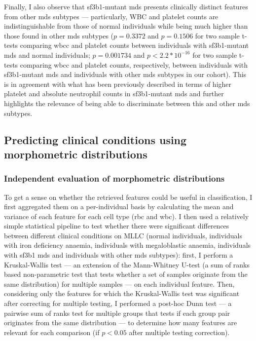 Finally, I also observe that \ac{sf3b1}-mutant \ac{mds} presents clinically distinct features from other \ac{mds} subtypes --- particularly, WBC and platelet counts are indistinguishable from those of normal individuals while being much higher than those found in other \ac{mds} subtypes ($p=0.3372$ and $p=0.1506$ for two sample t-tests comparing \ac{wbcc} and platelet counts between individuals with \ac{sf3b1}-mutant \ac{mds} and normal individuals; $p=0.001734$ and $p<2.2*10^{-16}$ for two sample t-tests comparing \ac{wbcc} and platelet counts, respectively, between individuals with \ac{sf3b1}-mutant \ac{mds} and individuals with other \ac{mds} subtypes in our cohort). This is in agreement with what has been previously described in terms of higher platelet and absolute neutrophil counts in \ac{sf3b1}-mutant \ac{mds} \cite{Malcovati2015-tz,Malcovati2020-no} and further highlights the relevance of being able to discriminate between this and other \ac{mds} subtypes. 

\subsection{Predicting clinical conditions using morphometric distributions}

\subsubsection{Independent evaluation of morphometric distributions}

To get a sense on whether the retrieved features could be useful in classification, I first aggregated them on a per-individual basis by calculating the mean and variance of each feature for each cell type (\ac{rbc} and \ac{wbc}). I then used a relatively simple statistical pipeline to test whether there were significant differences between different clinical conditions on MLLC (normal individuals, individuals with iron deficiency anaemia, individuals with megaloblastic anaemia, individuals with \ac{sf3b1} \ac{mds} and individuals with other \ac{mds} subtypes): first, I perform a Kruskal-Wallis test --- an extension of the Mann-Whitney U-test (a sum of ranks based non-parametric test that tests whether a set of samples originate from the same distribution) for multiple samples --- on each individual feature. Then, considering only the features for which the Kruskal-Wallis test was significant after correcting for multiple testing, I performed a post-hoc Dunn test --- a pairwise sum of ranks test for multiple groups that tests if each group pair originates from the same distribution --- to determine how many features are relevant for each comparison (if $p<0.05$ after multiple testing correction).

